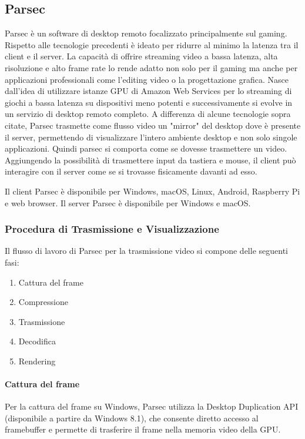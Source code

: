 \documentclass[12pt,a4paper,openright,twoside]{book}
\begin{document}
\subsection{Parsec}
\label{sec:parsec}
Parsec è un software di desktop remoto focalizzato principalmente sul gaming. Rispetto alle tecnologie precedenti è ideato per ridurre al minimo la latenza tra il client e il server.
La capacità di offrire streaming video a bassa latenza, alta risoluzione e alto frame rate lo rende adatto non solo per il gaming ma anche per applicazioni professionali come l'editing video o la progettazione grafica.
Nasce dall'idea di utilizzare istanze GPU di Amazon Web Services per lo streaming di giochi a bassa latenza su dispositivi meno potenti e successivamente si evolve in un servizio di desktop remoto completo.
%
A differenza di alcune tecnologie sopra citate,
Parsec trasmette come flusso video un "mirror" del desktop dove è presente il server,
permettendo di visualizzare l'intero ambiente desktop e non solo singole applicazioni. Quindi parsec si comporta come se dovesse trasmettere un video.
Aggiungendo la possibilità di trasmettere input da tastiera e mouse, il client può interagire con il server come se si trovasse fisicamente davanti ad esso.

Il client Parsec è disponibile per Windows, macOS, Linux, Android, Raspberry Pi e web browser. Il server Parsec è disponibile per Windows e macOS. 

\subsubsection{Procedura di Trasmissione e Visualizzazione}

Il flusso di lavoro di Parsec per la trasmissione video si compone delle seguenti fasi:
\begin{enumerate}
    \item Cattura del frame
    \item Compressione
    \item Trasmissione
    \item Decodifica
    \item Rendering
\end{enumerate}

\paragraph{Cattura del frame}
Per la cattura del frame su Windows, Parsec utilizza la Desktop Duplication API (disponibile a partire da Windows 8.1),
che consente diretto accesso al framebuffer e permette di trasferire il frame nella memoria video della GPU.
\end{document}
